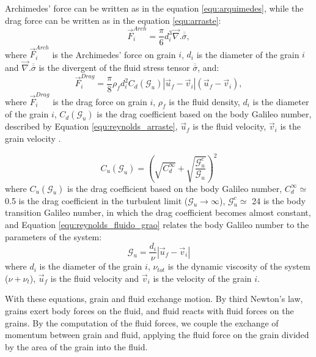     Archimedes' force can be written as in the equation \ref{equ:arquimedes}, while the drag force can be written as in the equation \ref{equ:arraste}: 
\begin{equation}
    \vec{F}_{i}^{Arch} = \frac{\pi}{6} d_{i}^{3} \vec{\nabla}.\overline{\overline{\sigma}},
    \label{equ:arquimedes}
\end{equation}
where  $\vec{F}_{i}^{Arch}$ is the Archimedes' force on grain $i$, $d_i$ is the diameter of the grain $i$ and $\vec{\nabla}.\overline{\overline{\sigma}}$ is the divergent of the fluid stress tensor $\overline{\overline{\sigma}}$, and:
\begin{equation}
    \vec{F}_{i}^{Drag} = \frac{\pi}{8}\rho_{f}d_{i}^{2}C_{d}(\mathcal{G}_{u})\left|\vec{u}_{f}-\vec{v}_{i}\right|(\vec{u}_{f}-\vec{v}_{i}),
    \label{equ:arraste}
\end{equation}
where $\vec{F}_{i}^{Drag}$ is the drag force on grain $i$, $\rho_f$ is the fluid density, $d_i$ is the diameter of the grain $i$, $C_{d}(\mathcal{G}_{u})$ is the drag coefficient based on the body Galileo number, described by Equation \ref{equ:reynolds_arraste}, $\vec{u}_{f}$ is the fluid velocity, $\vec{v}_{i}$ is the grain velocity \cite{Numerical_simulation_of_turbulent_sediment_transport}.

\begin{equation}
    C_{u}(\mathcal{G}_{u}) = \left( \sqrt{C_{d}^{\infty}} +\sqrt{\frac{\mathcal{G}_{u}^{c}}{\mathcal{G}_{u}}} \right)^{2}
    \label{equ:reynolds_arraste}
\end{equation}
where $C_{u}(\mathcal{G}_{u})$ is the drag coefficient based on the body Galileo number, $C_{d}^{\infty} \simeq$ 0.5 is the drag coefficient in the turbulent limit ($\mathcal{G}_{u} \to \infty$), $\mathcal{G}_{u}^{c} \simeq$ 24 is the body transition Galileo number, in which the drag coefficient becomes almost constant, and Equation \ref{equ:reynolds_fluido_grao} relates the body Galileo number to the parameters of the system:
\begin{equation}
    \mathcal{G}_{u} = \frac{d_{i}}{\nu} \left| \vec{u}_{f} -\vec{v}_{i} \right|
    \label{equ:reynolds_fluido_grao}
\end{equation}
where $d_i$ is the diameter of the grain $i$, $\nu_{tot}$ is the dynamic viscosity of the system ($\nu+\nu_t$), $\vec{u}_{f}$ is the fluid velocity and $\vec{v}_i$ is the velocity of the grain $i$.

    With these equations, grain and fluid exchange motion. By third Newton's law, grains exert body forces on the fluid, and fluid reacts with fluid forces on the grains. By the computation of the fluid forces, we couple the exchange of momentum between grain and fluid, applying the fluid force on the grain divided by the area of the grain into the fluid.

